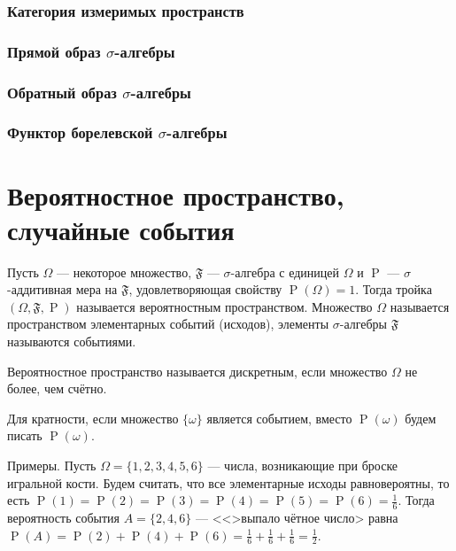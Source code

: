 \documentclass[12pt]{article}
\numberwithin{theorem}{section}
\numberwithin{proposition}{section}
\theoremstyle{definition}
\newcommand{\prob}{\operatorname{P}}
\newcommand{\defin}[2]{\hypertarget{#2}{{\color{red} #1}}}
\begin{document}
	\subsubsection{Категория измеримых пространств}
	
	\subsubsection{Прямой образ $ \sigma $-алгебры}
	
	\subsubsection{Обратный образ $ \sigma $-алгебры}
	
	\subsubsection{Функтор борелевской $ \sigma $-алгебры}
	
	\section{Вероятностное пространство, случайные события}
	
	Пусть $ \Omega $ --- некоторое множество, $ \mathfrak{F} $ --- $ \sigma $-алгебра с единицей $ \Omega $
	и $ \prob $ --- $ \sigma $-аддитивная мера на $ \mathfrak{F} $, удовлетворяющая свойству $ \prob(\Omega) = 1 $. 
	Тогда тройка $ (\Omega, \mathfrak{F}, \prob) $ называется \defin{вероятностным пространством}{prob-space}.
	Множество $ \Omega $ называется \defin{пространством элементарных событий (исходов)}{space},
	элементы $ \sigma $-алгебры $ \mathfrak{F} $ называются \defin{событиями}{event}.
	
	Вероятностное пространство называется \defin{дискретным}{discr}, если множество $ \Omega $ не более, чем счётно.
	
	Для кратности, если множество $ \{\omega\} $ является событием, вместо $ \prob({\omega}) $ будем писать $ \prob(\omega) $.
	
	Примеры. Пусть $ \Omega = \{1,2,3,4,5,6\} $ --- числа, возникающие при броске игральной кости.
	Будем считать, что все элементарные исходы равновероятны, 
	то есть $ \prob(1) = \prob(2) = \prob(3) = \prob(4) = \prob(5) = \prob(6) = \tfrac{1}{6} $.
	Тогда вероятность события $ A = \{2,4,6\} $ --- <<>выпало чётное число> 
	равна $ \prob(A) = \prob(2) + \prob(4) + \prob(6) = \tfrac{1}{6} + \tfrac{1}{6} + \tfrac{1}{6} = \tfrac{1}{2} $.
	
\end{document}
